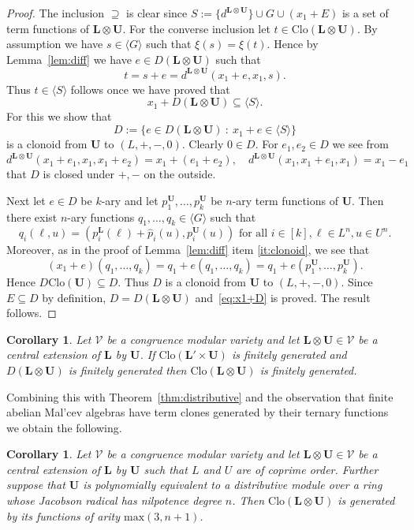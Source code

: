 \documentclass[12pt]{amsart}
\numberwithin{equation}{section}
\theoremstyle{plain}
\newtheorem{cor}[theorem]{Corollary}
\theoremstyle{definition}
\newcommand{\st}{\ :\ }
\renewcommand{\L}{\mathbf{L}}
\newcommand{\U}{\mathbf{U}}
\newcommand{\V}{\mathcal{V}}
\newcommand{\Clo}{\mathrm{Clo}}
\begin{document}
\begin{proof}
  The inclusion $\supseteq$ is clear since $S :=  \{d^{\L\otimes\U}\} \cup G \cup (x_1+E)$ 
    is a set of term functions of $\L\otimes\U$.
  For the converse inclusion let $t\in\Clo(\L\otimes\U)$. 
  By assumption we have $s\in\langle G\rangle$ such that $\xi(s) = \xi(t)$. 
  Hence by Lemma~\ref{lem:diff} we have $e\in D(\L\otimes\U)$ such that
    \[ t=s+e = d^{\L\otimes\U}(x_1+e,x_1,s). \]
  Thus $t\in\langle S\rangle$ follows once we have proved that
    \begin{equation} \label{eq:x1+D} 
      x_1+D(\L\otimes\U) \subseteq \langle S\rangle.
    \end{equation}
  For this we show that
    \[ D := \{e\in D(\L\otimes\U) \st x_1+e \in \langle S\rangle \} \]
    is a clonoid from $\U$ to $(L,+,-,0)$. 
  Clearly $0\in D$. For $e_1,e_2\in D$ we see from
    \[ d^{\L\otimes\U}(x_1+e_1, x_1, x_1+e_2) = x_1+(e_1+e_2),\quad d^{\L\otimes\U}(x_1,x_1+e_1,x_1) = x_1-e_1 \]
    that $D$ is closed under $+,-$ on the outside.

  Next let $e\in D$ be $k$-ary and let $p_1^\U,\dots,p_k^\U$ be $n$-ary term functions of $\U$. 
  Then there exist $n$-ary functions $q_1,\dots,q_k\in\langle G\rangle$ such that
    \[q_{i}(\ell,u) = (p_{i}^\L(\ell)+ \hat{p}_{i}(u), p_{i}^\U(u)) \text{ for all } i\in [k],\ell\in L^n,u\in U^n.\]
  Moreover, as in the proof of Lemma~\ref{lem:diff} item \ref{it:clonoid}, we see that
    \[ (x_1+e)(q_1,\dots,q_k) = q_1+e(q_{1},\dots,q_{k}) = q_1+e(p_1^\U,\dots,p_k^\U). \]
  Hence $D \Clo(\U) \subseteq D$. Thus $D$ is a clonoid from  $\U$ to $(L,+,-,0)$. Since $E\subseteq D$ by definition,
    $D=D(\L\otimes\U)$ and~\eqref{eq:x1+D} is proved. The result follows.
\end{proof}

\begin{cor} \label{cor:fingen} 
  Let $\V$ be a congruence modular variety and let $\L \otimes \U \in \V$ be a central 
    extension of $\L$ by $\U$.
  If $\Clo(\L' \times \U)$ is finitely generated and $D(\L \otimes \U)$ is finitely generated 
    then $\Clo(\L \otimes \U)$ is finitely generated. 
\end{cor}

Combining this with Theorem~\ref{thm:distributive} and the observation that finite abelian Mal'cev 
  algebras have term clones generated by their ternary functions we obtain the following.

\begin{cor} \label{cor:termclonefg} 
  Let $\V$ be a congruence modular variety and let $\L \otimes \U \in \V$ be a central extension 
    of $\L$ by $\U$ such that $L$ and $U$ are of coprime order. 
  Further suppose that $\U$ is polynomially equivalent to a distributive module over a ring whose 
  Jacobson radical has nilpotence degree $n$.
  Then $\Clo(\L \otimes \U)$ is generated by its functions of arity $\text{max}(3, n+1)$.
\end{cor}
\end{document}
